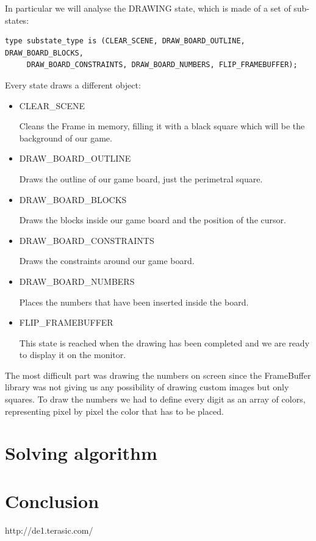 \documentclass[12pt]{report}
\begin{document}
In particular we will analyse the DRAWING state, which is made of a set of
sub-states:

\begin{verbatim}
type substate_type is (CLEAR_SCENE, DRAW_BOARD_OUTLINE, DRAW_BOARD_BLOCKS,
     DRAW_BOARD_CONSTRAINTS, DRAW_BOARD_NUMBERS, FLIP_FRAMEBUFFER);
\end{verbatim}

Every state draws a different object:

\begin{itemize}
  \item CLEAR\_SCENE

  Cleans the Frame in memory, filling it with a black square which will be
  the background of our game.

  \item DRAW\_BOARD\_OUTLINE

  Draws the outline of our game board, just the perimetral square.

  \item DRAW\_BOARD\_BLOCKS

  Draws the blocks inside our game board and the position of the cursor.

  \item DRAW\_BOARD\_CONSTRAINTS

  Draws the constraints around our game board.

  \item DRAW\_BOARD\_NUMBERS

  Places the numbers that have been inserted inside the board.

  \item FLIP\_FRAMEBUFFER

  This state is reached when the drawing has been completed and we are
  ready to display it on the monitor.
\end{itemize}

The most difficult part was drawing the numbers on screen since the
FrameBuffer library was not giving us any possibility of drawing custom
images but only squares. To draw the numbers we had to define every digit
as an array of colors, representing pixel by pixel the color that has to
be placed.

\chapter*{Solving algorithm}



\chapter*{Conclusion}


\renewcommand{\bibname}{References}
\begin{thebibliography}{100}

 http://de1.terasic.com/

\end{thebibliography}
\end{document}
